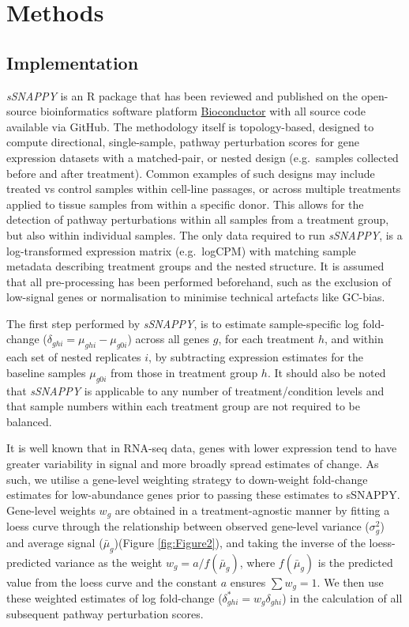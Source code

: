 \documentclass[9pt,a4paper,]{extarticle}
\begin{document}
\hypertarget{methods}{%
\section{Methods}\label{methods}}

\hypertarget{implementation}{%
\subsection{Implementation}\label{implementation}}

\emph{sSNAPPY} is an R package that has been reviewed and published on the open-source bioinformatics software platform \href{https://bioconductor.org/packages/release/bioc/html/*sSNAPPY*.html}{Bioconductor} with all source code available via GitHub.
The methodology itself is topology-based, designed to compute directional, single-sample, pathway perturbation scores for gene expression datasets with a matched-pair, or nested design (e.g.~samples collected before and after treatment).
Common examples of such designs may include treated vs control samples within cell-line passages, or across multiple treatments applied to tissue samples from within a specific donor.
This allows for the detection of pathway perturbations within all samples from a treatment group, but also within individual samples.
The only data required to run \emph{sSNAPPY}, is a log-transformed expression matrix (e.g.~logCPM) with matching sample metadata describing treatment groups and the nested structure.
It is assumed that all pre-processing has been performed beforehand, such as the exclusion of low-signal genes or normalisation to minimise technical artefacts like GC-bias.

The first step performed by \emph{sSNAPPY}, is to estimate sample-specific log fold-change (\(\delta_{ghi} = \mu_{ghi} - \mu_{g0i}\)) across all genes \(g\), for each treatment \(h\), and within each set of nested replicates \(i\), by subtracting expression estimates for the baseline samples \(\mu_{g0i}\) from those in treatment group \(h\).
It should also be noted that \emph{sSNAPPY} is applicable to any number of treatment/condition levels and that sample numbers within each treatment group are not required to be balanced.

It is well known that in RNA-seq data, genes with lower expression tend to have greater variability in signal and more broadly spread estimates of change\citep{Law2014}.
As such, we utilise a gene-level weighting strategy to down-weight fold-change estimates for low-abundance genes prior to passing these estimates to sSNAPPY.
Gene-level weights \(w_g\) are obtained in a treatment-agnostic manner by fitting a loess curve through the relationship between observed gene-level variance (\(\sigma^2_g\)) and average signal (\(\bar\mu_{g}\))(Figure \ref{fig:Figure2}), and taking the inverse of the loess-predicted variance as the weight \(w_g = a / f(\bar\mu_{g})\), where \(f(\bar\mu_{g})\) is the predicted value from the loess curve and the constant \(a\) ensures \(\sum w_g = 1\).
We then use these weighted estimates of log fold-change (\(\delta_{ghi}^* = w_g\delta_{ghi}\)) in the calculation of all subsequent pathway perturbation scores.
\end{document}
